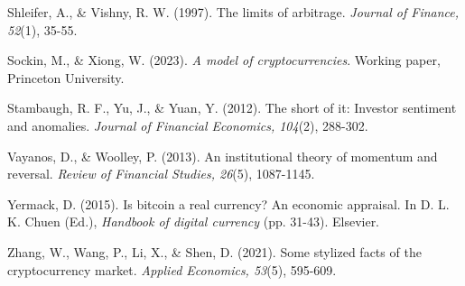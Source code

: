 \documentclass[
]{article}
\begin{document}
Shleifer, A., \& Vishny, R. W. (1997). The limits of arbitrage.
\emph{Journal of Finance, 52}(1), 35-55.

Sockin, M., \& Xiong, W. (2023). \emph{A model of cryptocurrencies}.
Working paper, Princeton University.

Stambaugh, R. F., Yu, J., \& Yuan, Y. (2012). The short of it: Investor
sentiment and anomalies. \emph{Journal of Financial Economics, 104}(2),
288-302.

Vayanos, D., \& Woolley, P. (2013). An institutional theory of momentum
and reversal. \emph{Review of Financial Studies, 26}(5), 1087-1145.

Yermack, D. (2015). Is bitcoin a real currency? An economic appraisal.
In D. L. K. Chuen (Ed.), \emph{Handbook of digital currency} (pp.
31-43). Elsevier.

Zhang, W., Wang, P., Li, X., \& Shen, D. (2021). Some stylized facts of
the cryptocurrency market. \emph{Applied Economics, 53}(5), 595-609.
\end{document}
